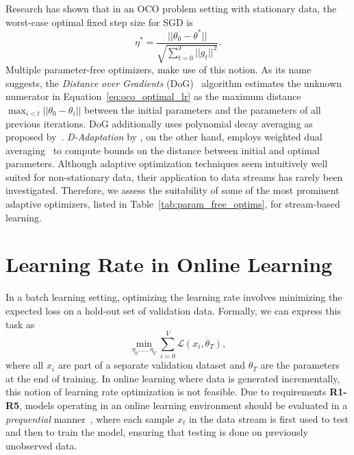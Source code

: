 \documentclass[runningheads]{llncs}
\begin{document}
Research has shown that in an OCO problem setting with stationary data, the worst-case optimal fixed step size for SGD is
\begin{equation}\label{eq:oco_optimal_lr}
	\eta^* = \frac{||\theta_0 - \theta^*||}{\sqrt{\sum_{t=0}^{T} ||g_t||^2}}.
\end{equation}
Multiple parameter-free optimizers, make use of this notion.
As its name suggests, the \textit{Distance over Gradients} (DoG)~\cite{ivgiDoGSGDBest2023} algorithm estimates the unknown numerator in Equation~\ref{eq:oco_optimal_lr} as the maximum distance $\max_{i<t}||\theta_0 - \theta_i||$ between the initial parameters and the parameters of all previous iterations.
DoG additionally uses polynomial decay averaging as proposed by~\textcite{shamirStochasticGradientDescent2012}.
\textit{D-Adaptation} by \textcite{defazioLearningRateFreeLearningDAdaptation2023a}, on the other hand, employs weighted dual averaging~\cite{duchiDualAveragingDistributed2012} to compute bounds on the distance between initial and optimal parameters.
Although adaptive optimization techniques seem intuitively well suited for non-stationary data, their application to data streams has rarely been investigated.
Therefore, we assess the suitability of some of the most prominent adaptive optimizers, listed in Table~\ref{tab:param_free_optims}, for stream-based learning.

\section{Learning Rate in Online Learning}

In a batch learning setting, optimizing the learning rate involves minimizing the expected loss on a hold-out set of validation data.
Formally, we can express this task as
\begin{equation}
	\label{eq:batch_lr_optim}
	\min_{\eta_0, \ldots, \eta_T} \sum_{i=0}^V \mathcal{L}(x_i, \theta_T),
\end{equation}
where all $x_i$ are part of a separate validation dataset and $\theta_T$ are the parameters at the end of training.
In online learning where data is generated incrementally, this notion of learning rate optimization is not feasible.
Due to requirements \textbf{R1-R5}, models operating in an online learning environment should be evaluated in a \textit{prequential} manner~\cite{bifetMOAMassiveOnline2010}, where each sample $x_t$ in the data stream is first used to test and then to train the model, ensuring that testing is done on previously unobserved data.
\end{document}
